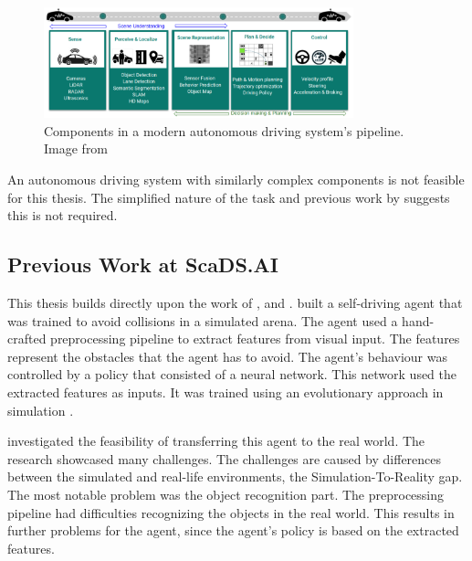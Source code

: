 \begin{figure}
    \centering
    \includegraphics[width=0.8\textwidth]{Bilder/ad_components_from_paper_drl_for_ad.png}
    \caption{Components in a modern autonomous driving system's pipeline. Image from \textcite{drl_for_ad}}
    \label{fig:ad_components}
\end{figure}

An autonomous driving system with similarly complex components is not feasible for this thesis. The simplified nature of the task and previous work by \textcite{maximilian} suggests this is not required.


\subsection{Previous Work at ScaDS.AI}
This thesis builds directly upon the work of \textcite{jonas_koenig}, \textcite{merlin_flach} and \textcite{maximilian}. 
\textcite{jonas_koenig} built a self-driving agent that was trained to avoid collisions in a simulated arena. The agent used a hand-crafted preprocessing pipeline to extract features from visual input. The features represent the obstacles that the agent has to avoid. The agent's behaviour was controlled by a policy that consisted of a neural network. This network used the extracted features as inputs. It was trained using an evolutionary approach in simulation .

\textcite{merlin_flach} investigated the feasibility of transferring this agent to the real world. The research showcased many challenges. The challenges are caused by differences between the simulated and real-life environments, the Simulation-To-Reality gap. The most notable problem was the object recognition part. The preprocessing pipeline had difficulties recognizing the objects in the real world. This results in further problems for the agent, since the agent's policy is based on the extracted features.

